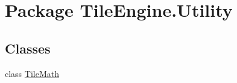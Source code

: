 \hypertarget{namespace_tile_engine_1_1_utility}{\section{Package Tile\-Engine.\-Utility}
\label{db/dab/namespace_tile_engine_1_1_utility}
}
\subsection*{Classes}
\begin{DoxyCompactItemize}
\item 
class \hyperlink{class_tile_engine_1_1_utility_1_1_tile_math}{Tile\-Math}
\end{DoxyCompactItemize}
